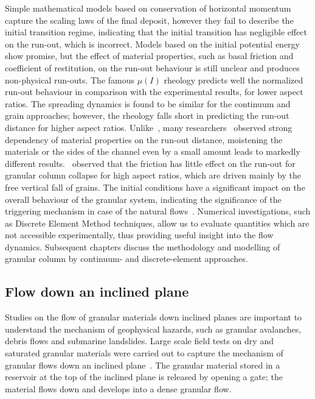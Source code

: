 Simple mathematical models based on conservation of horizontal momentum capture 
the scaling laws of the final deposit, however they fail to describe the 
initial transition regime, indicating that the initial transition has 
negligible effect on the run-out, which is incorrect. Models based on the 
initial potential energy show promise, but the effect of material properties, 
such as basal friction and coefficient of restitution, on the run-out behaviour 
is still unclear and produces non-physical run-outs. The famous 
$\mu(\textit{I})$ rheology predicts well the normalized run-out behaviour in 
comparison with the experimental results, for lower aspect ratios. The 
spreading dynamics is found to be similar for the continuum and grain 
approaches; however, the rheology falls short in predicting the run-out 
distance for higher aspect ratios. Unlike~\citet{Lube2005}, many 
researchers~\citep{Balmforth2005,Kerswell2005} observed strong dependency of 
material properties on the run-out distance, moistening the materials or the 
sides of the channel even by a small amount leads to markedly different 
results.~\citet{Staron2007a} observed that the friction has little effect on 
the 
run-out for granular column collapse for high aspect ratios, which are driven 
mainly by the free vertical fall of grains. The initial conditions have a 
significant impact on the overall behaviour of the granular system, indicating 
the significance of the triggering mechanism in case of the natural 
flows~\citep{Staron2007a}. Numerical investigations, such as Discrete Element 
Method 
techniques, allow us to evaluate quantities which are not accessible 
experimentally, thus providing useful insight into the flow dynamics. 
Subsequent chapters discuss the methodology and modelling of granular column by 
continuum- and discrete-element approaches.

\subsection{Flow down an inclined plane}
Studies on the flow of granular materials down inclined planes are important to 
understand the mechanism of geophysical hazards, such as granular avalanches, 
debris flows and submarine landslides. Large scale field tests on dry and 
saturated granular materials were carried out to capture the mechanism of 
granular flows down an inclined plane~\citep{Okada2008,Denlinger2001}. The 
granular material stored in a reservoir at the top of the inclined plane is 
released by opening a gate; the material flows down and develops into a dense 
granular flow. 

